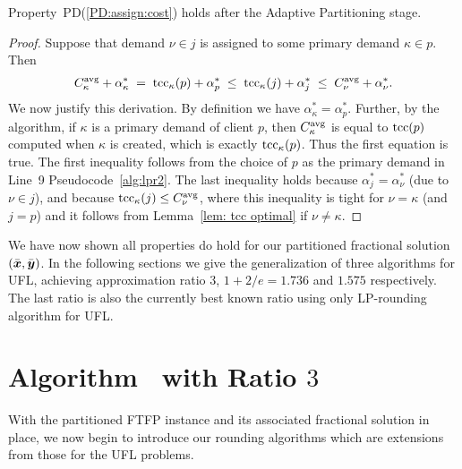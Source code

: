 \documentclass[11pt]{article}
\begin{document}

\begin{lemma}\label{lem: PD:assign:cost holds}
Property~PD(\ref{PD:assign:cost}) holds after the Adaptive Partitioning stage.
\end{lemma}

\begin{proof}
Suppose that demand $\nu\in j$ is assigned to some primary demand $\kappa\in p$.
Then
%
\begin{eqnarray*}
 C^{{\mbox{\scriptsize\rm avg}}}_{\kappa} + \alpha_{\kappa}^\ast \;=\; \textrm{tcc}_\kappa(p) + \alpha^\ast_p
 					\;\le\; \textrm{tcc}_\kappa(j) + \alpha^\ast_j   
					\;\le\; C^{{\mbox{\scriptsize\rm avg}}}_{\nu} + \alpha^\ast_\nu.
\end{eqnarray*}
%
We now justify this derivation. By definition we have
$\alpha_{\kappa}^\ast = \alpha^\ast_p$.  Further, by the
algorithm, if $\kappa$ is a primary demand of client $p$,
then $C^{{\mbox{\scriptsize\rm avg}}}_{\kappa}$ is equal to $\textrm{tcc}(p)$ computed when
$\kappa$ is created, which is exactly $\textrm{tcc}_\kappa(p)$. Thus
the first equation is true. The first inequality follows
from the choice of $p$ as the primary demand in Line~9
Pseudocode~\ref{alg:lpr2}. The last inequality holds
because $\alpha^\ast_j = \alpha^\ast_\nu$ (due to $\nu\in
j$), and because $\textrm{tcc}_\kappa(j) \le C^{{\mbox{\scriptsize\rm avg}}}_{\nu}$, where
this inequality is tight for $\nu = \kappa$ (and $j=p$) and
it follows from Lemma~\ref{lem: tcc optimal} if
$\nu\neq\kappa$.
\end{proof}

We have now shown all properties do hold for our partitioned
fractional solution $(\bar{\boldsymbol{x}},\bar{\boldsymbol{y}})$. In the following
sections we give the generalization of three algorithms for
UFL, achieving approximation ratio $3$, $1+2/e=1.736$ and
$1.575$ respectively. The last ratio is also the currently
best known ratio using only LP-rounding algorithm for UFL.


\section{Algorithm~{\EGUP} with Ratio $3$}
\label{sec: 3-approximation}

With the partitioned FTFP instance and its associated
fractional solution in place, we now begin to introduce our
rounding algorithms which are extensions from those for the
UFL problems.
\end{document}

